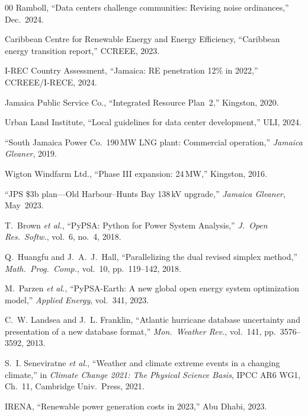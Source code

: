 \documentclass[conference,10pt]{IEEEtran}
\begin{document}
\begin{thebibliography}{00}
 Ramboll, ``Data centers challenge communities: Revising noise ordinances,'' Dec.~2024.

 Caribbean Centre for Renewable Energy and Energy Efficiency, ``Caribbean energy transition report,'' CCREEE, 2023.

 I-REC Country Assessment, ``Jamaica: RE penetration 12\% in 2022,'' CCREEE/I-RECE, 2024.

 Jamaica Public Service Co., ``Integrated Resource Plan~2,'' Kingston, 2020.

 Urban Land Institute, ``Local guidelines for data center development,'' ULI, 2024.

 ``South Jamaica Power Co.\ 190\,MW LNG plant: Commercial operation,'' \textit{Jamaica Gleaner}, 2019.

 Wigton Windfarm Ltd., ``Phase III expansion: 24\,MW,'' Kingston, 2016.

 ``JPS \$3b plan---Old Harbour--Hunts Bay 138\,kV upgrade,'' \textit{Jamaica Gleaner}, May~2023.

 T.~Brown \textit{et al.}, ``PyPSA: Python for Power System Analysis,'' \textit{J.~Open Res.~Softw.}, vol.~6, no.~4, 2018.

 Q.~Huangfu and J.~A.~J.~Hall, ``Parallelizing the dual revised simplex method,'' \textit{Math.\ Prog.\ Comp.}, vol.~10, pp.~119--142, 2018.

 M.~Parzen \textit{et al.}, ``PyPSA-Earth: A new global open energy system optimization model,'' \textit{Applied Energy}, vol.~341, 2023.

 C.~W. Landsea and J.~L. Franklin, ``Atlantic hurricane database uncertainty and presentation of a new database format,'' \textit{Mon.\ Weather Rev.}, vol.~141, pp.~3576--3592, 2013.

 S.~I. Seneviratne \textit{et al.}, ``Weather and climate extreme events in a changing climate,'' in \textit{Climate Change 2021: The Physical Science Basis}, IPCC AR6 WG1, Ch.~11, Cambridge Univ.\ Press, 2021.

 IRENA, ``Renewable power generation costs in 2023,'' Abu Dhabi, 2023.

\end{thebibliography}
\end{document}
